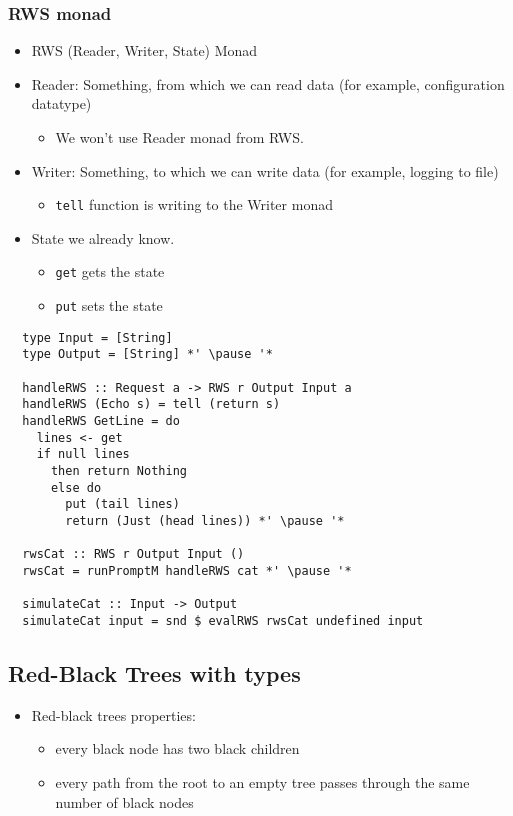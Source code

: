 \documentclass[aspectratio=43]{beamer}
\begin{document}
\begin{frame}
 \frametitle{RWS monad}
 \begin{itemize}
  \item RWS (Reader, Writer, State) Monad
  \pause
  \item Reader: Something, from which we can read data (for example, configuration datatype)
  \pause
  \begin{itemize}
   \item We won't use Reader monad from RWS.
  \end{itemize}
  \pause
  \item Writer: Something, to which we can write data (for example, logging to file)
  \pause
  \begin{itemize}
   \item \texttt{tell} function is writing to the Writer monad
  \end{itemize}
  \pause
  \item State we already know.
  \pause
  \begin{itemize}
   \item \texttt{get} gets the state
   \item \texttt{put} sets the state
  \end{itemize}
 \end{itemize}
\end{frame}

\begin{frame}[fragile]
 \begin{lstlisting}
  type Input = [String]
  type Output = [String] *' \pause '*

  handleRWS :: Request a -> RWS r Output Input a
  handleRWS (Echo s) = tell (return s)
  handleRWS GetLine = do
    lines <- get
    if null lines
      then return Nothing
      else do
        put (tail lines)
        return (Just (head lines)) *' \pause '*
  
  rwsCat :: RWS r Output Input ()
  rwsCat = runPromptM handleRWS cat *' \pause '*
  
  simulateCat :: Input -> Output
  simulateCat input = snd $ evalRWS rwsCat undefined input
 \end{lstlisting}
\end{frame}

\subsection{Red-Black Trees with types}

\begin{frame}
 \begin{itemize}
  \item Red-black trees properties:
  \begin{itemize}
    \item every black node has two black children
    \item every path from the root to an empty tree passes through the same number of black nodes
  \end{itemize}
 \end{itemize}
\end{frame}
\end{document}
